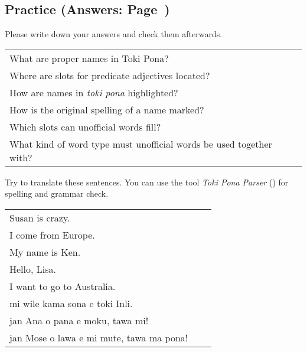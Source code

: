 \newpage

\subsection*{Practice (Answers: Page~\pageref{'unofficial_words_answers'})}
Please write down your answers and check them afterwards.

\begin{supertabular}{p{5,5cm}|ll}
    What are proper names in Toki Pona?                                 &  & \\
    Where are slots for predicate adjectives located?                   &  & \\
    How are names in \textit{toki pona} highlighted?                    &  & \\
    How is the original spelling of a name marked?                      &  & \\
    Which slots can unofficial words fill?                              &  & \\
    What kind of word type must unofficial words be used together with? &  & \\
\end{supertabular}

Try to translate these sentences.
You can use the tool \textit{Toki Pona Parser} (\cite{www:rowa:02}) for spelling and grammar check.

\begin{supertabular}{p{5,5cm}|ll}
    Susan is crazy.                          &  & \\
    I come from Europe.                      &  & \\
    My name is Ken.                          &  & \\
    Hello, Lisa.                             &  & \\
    I want to go to Australia.               &  & \\
    mi wile kama sona e toki Inli.           &  & \\
    jan Ana o pana e moku, tawa mi!          &  & \\
    jan Mose o lawa e mi mute, tawa ma pona! &  & \\
\end{supertabular}
